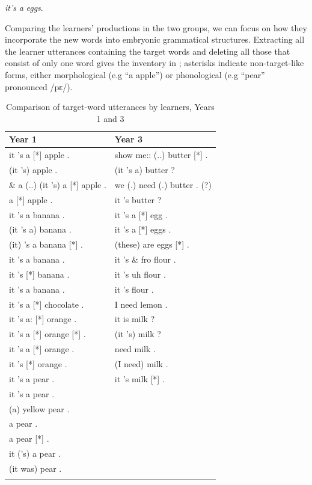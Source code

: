 \documentclass[output=paper,colorlinks,citecolor=brown,modfonts,nonflat]{../langscibook}
\begin{document}
\textit{it’s} \textit{a} \textit{eggs}. 

Comparing the learners’ productions in the two groups, we can focus on how they incorporate the new words into embryonic grammatical structures. Extracting all the learner utterances containing the target words and deleting all those that consist of only one word gives the inventory in ; asterisks indicate non-target-like forms, either morphological (e.g “a apple”) or phonological (e.g “pear” pronounced /pɛ/).

\begin{table}
\caption{Comparison of target-word utterances by learners, Years 1 and 3\label{tab:hilton:6}}
\begin{tabularx}{\textwidth}{QQ}
\lsptoprule
Year 1 & Year 3\\
\midrule
it 's a [*] apple . & show me:: (..) butter [*] .\\
(it 's) apple . & (it 's a) butter ?\\
\& a (..) (it 's) a [*] apple . & we (.) need (.) butter . (?)\\
a [*] apple . & it 's butter ?\\
it 's a banana . & it 's a [*] egg .\\
(it 's a) banana . & it 's a [*] eggs .\\
(it) 's a banana [*] . & (these) are eggs [*] .\\
it 's a banana . & it 's \& fro flour .\\
it 's [*] banana . & it 's uh flour .\\
it 's a banana . & it 's flour .\\
it 's a [*] chocolate . & I need lemon .\\
it 's a: [*] orange . & it is milk ?\\
it 's a [*] orange [*] . & (it 's) milk ?\\
it 's a [*] orange . & need milk .\\
 it 's [*] orange . & (I need) milk .\\
it 's a pear . & it 's milk [*] .\\
it 's a pear . & \\
(a) yellow pear . & \\
a pear . & \\
a pear [*] . & \\
it ('s) a pear . & \\
(it was) pear . & \\
\lspbottomrule
\end{tabularx}
\end{table}
\end{document}
